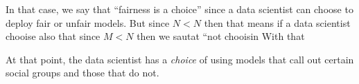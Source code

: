 In that case, we say that ``fairness is a choice'' since a data scientist can choose
to deploy fair or unfair models. But since $N<N$ then that means if a data scientist
chooise also that since $M<N$ then we sautat
``not chooisin
With that 


At that point, the data scientist has a {\em choice} of using
models that call out certain social groups and those that do not. 



% 



